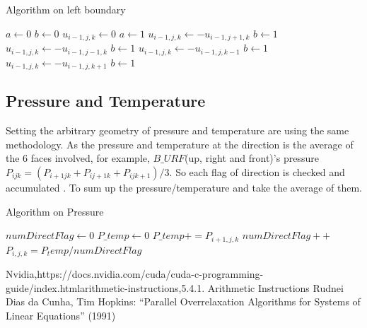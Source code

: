 \documentclass{article}%
\begin{document}
\begin{algorithm}
\caption{Algorithm on left boundary}\label{euclid}
\begin{algorithmic}
	\State $a\gets 0$
	\State $b\gets 0$ 
    		\State $u_{i-1,j,k}\gets 0$
    		\State $a\gets 1$
    	\EndIf
    			\State $u_{i-1,j,k}\gets -u_{i-1,j+1,k}$
    			\State $b\gets 1$
    		\EndIf	
    	\EndIf
    			\State $u_{i-1,j,k}\gets -u_{i-1,j-1,k}$
    			\State $b\gets 1$
    		\EndIf	
    	\EndIf 
    			\State $u_{i-1,j,k}\gets -u_{i-1,j,k-1}$
    			\State $b\gets 1$
    		\EndIf	
    	\EndIf    	   	
    			\State $u_{i-1,j,k}\gets -u_{i-1,j,k+1}$
    			\State $b\gets 1$
    		\EndIf	
    	\EndIf       	
\EndIf
\EndFor
\end{algorithmic}
\end{algorithm}

\subsection{Pressure and Temperature}
Setting the arbitrary geometry of pressure and temperature are using the same methodology. As the pressure and temperature at the direction is the average of the 6 faces involved, for example, $B\_URF$(up, right and front)’s pressure $P_{ijk} = (P_{i+1jk} + P_{ij+1k} + P_{ijk+1})/3$. So each flag of direction is checked and accumulated .  To sum up the pressure/temperature and take the average of them. 

\begin{algorithm}
\caption{Algorithm on Pressure}\label{euclid}
\begin{algorithmic}
	\State $numDirectFlag\gets 0$
	\State $P\_temp\gets 0$
    		\State $P\_temp += P_{i+1,j,k}$
    		\State $numDirectFlag++$
    	\EndIf
    \State $P_{i,j,k}= P_temp / numDirectFlag$
\EndIf
\EndFor
\end{algorithmic}
\end{algorithm}



\begin{thebibliography}{999}

Nvidia,https://docs.nvidia.com/cuda/cuda-c-programming-guide/index.html\text{\#}arithmetic-instructions,5.4.1. Arithmetic Instructions
Rudnei Dias da Cunha, Tim Hopkins: “Parallel Overrelaxation Algorithms for Systems of Linear Equations” (1991)
\end{thebibliography}
\end{document}
